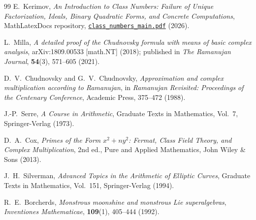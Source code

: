 \documentclass[a4paper]{article}
\begin{document}
\begin{thebibliography}{99}
E.~Kerimov, \emph{An Introduction to Class Numbers: Failure of Unique Factorization, Ideals, Binary Quadratic Forms, and Concrete Computations}, MathLatexDocs repository, \href{class_numbers_main.pdf}{\texttt{class\_numbers\_main.pdf}} (2026).

L.~Milla, \emph{A detailed proof of the Chudnovsky formula with means of basic complex analysis}, arXiv:1809.00533 [math.NT] (2018); published in \emph{The Ramanujan Journal}, \textbf{54}(3), 571--605 (2021).

D.~V.~Chudnovsky and G.~V.~Chudnovsky, \emph{Approximation and complex multiplication according to Ramanujan}, in \emph{Ramanujan Revisited: Proceedings of the Centenary Conference}, Academic Press, 375--472 (1988).

J.-P.~Serre, \emph{A Course in Arithmetic}, Graduate Texts in Mathematics, Vol.~7, Springer-Verlag (1973).

D.~A.~Cox, \emph{Primes of the Form $x^2 + n y^2$: Fermat, Class Field Theory, and Complex Multiplication}, 2nd ed., Pure and Applied Mathematics, John Wiley \& Sons (2013).

J.~H.~Silverman, \emph{Advanced Topics in the Arithmetic of Elliptic Curves}, Graduate Texts in Mathematics, Vol.~151, Springer-Verlag (1994).

R.~E.~Borcherds, \emph{Monstrous moonshine and monstrous Lie superalgebras}, \emph{Inventiones Mathematicae}, \textbf{109}(1), 405--444 (1992).
\end{thebibliography}
\end{document}
